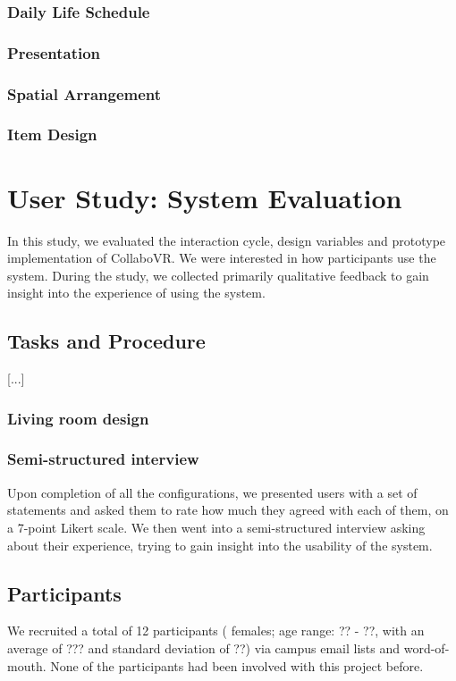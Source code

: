 \documentclass{sigchi}
\begin{document}
\subsubsection{Daily Life Schedule}

\subsubsection{Presentation}

\subsubsection{Spatial Arrangement}

\subsubsection{Item Design}

\section{User Study: System Evaluation}
In this study, we evaluated the interaction cycle, design variables and prototype implementation of CollaboVR. We were interested in how participants use the system. During the study, we collected primarily qualitative feedback to gain insight into the experience of using the system.
\subsection{Tasks and Procedure}
[...]
\subsubsection{Living room design}
\subsubsection{Semi-structured interview}
Upon completion of all the configurations, we presented users with a set of statements and asked them to rate how much they agreed with each of them, on a 7-point Likert scale. We then went into a semi-structured interview asking about their experience, trying to gain insight into the usability of the system.
\subsection{Participants}
We recruited a total of 12 participants ( females; age range: ?? - ??, with an average of ??? and standard deviation of ??) via campus email lists and word-of-mouth. None of the participants had been involved with this project before.
\end{document}
